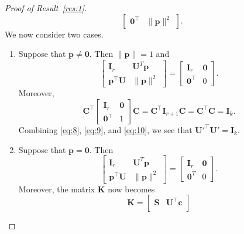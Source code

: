 \documentclass[11pt,a4paper]{article}
\theoremstyle{mybreak}
\numberwithin{dummy}{section}
\theoremstyle{plain}
\theoremstyle{plain}
\theoremstyle{plain}
\theoremstyle{plain}
\theoremstyle{MyNonumberplain}
\newtheorem{proof}{Proof}
\newcommand{\0}{\M{0}}
\newcommand{\M}[1]{\mathbf{#1}}
\newcommand{\T}{\top}
\newcommand{\ve}[1]{\mathbf{#1}}
\begin{document}
\begin{proof}[Proof of Result~\ref{res:1}]
\begin{displaymath}
\begin{bmatrix}
      \0^\T& \| \ve{p} \|^2
    \end{bmatrix}.
  \end{displaymath}
  We now consider two cases.
  \begin{enumerate}[font=\upshape,label=(\roman*),wide,align=right]
    \item Suppose that $\ve{p} \neq \0$. Then $\| \ve{p} \| = 1$ and
    \begin{equation}
      \label{eq:9}
      \begin{bmatrix}
        \M{I}_r & \M{U}^T \ve{p}
        \\
        \ve{p}^\T \M{U} & \| \ve{p} \|^2
      \end{bmatrix}
      =
      \begin{bmatrix}
        \M{I}_r & \0 \\
        \0^\T& 0
      \end{bmatrix}.
    \end{equation}
    Moreover,
    \begin{equation}
      \label{eq:10}
      \M{C}^\T
      \begin{bmatrix}
        \M{I}_r & \0 \\
        \0^\T& 1
      \end{bmatrix}
      \M{C}
      =
      \M{C}^\T \M{I}_{r+1} \M{C}
      =
      \M{C}^\T \M{C}
      = \M{I}_k.
    \end{equation}
    Combining \eqref{eq:8}, \eqref{eq:9}, and \eqref{eq:10}, we see that
    \begin{math}
      \M{U}'^\T \M{U'} = \M{I}_k.
    \end{math}
  \item Suppose that $\ve{p} = \0$. Then
    \begin{equation}
      \label{eq:11}
      \begin{bmatrix}
        \M{I}_r & \M{U}^T \ve{p} \\
        \ve{p}^\T \M{U} & \| \ve{p} \|^2
      \end{bmatrix}
      =
      \begin{bmatrix}
        \M{I}_r & \0 \\
        \0^T & 0
      \end{bmatrix}.
    \end{equation}
    Moreover, the matrix $\M{K}$ now becomes
    \begin{displaymath}
      \M{K} =
      \begin{bmatrix}
        \M{S} & \M{U}^\T \ve{c} \\

\end{bmatrix}
\end{displaymath}
\end{enumerate}
\end{proof}
\end{document}
